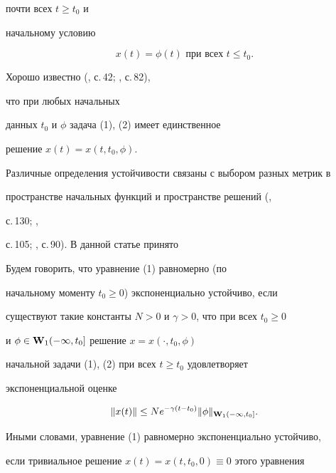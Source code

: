 почти всех $t\ge t_0$ и


начальному условию




\begin{equation}


x(t)=\phi(t)\text{ при всех }t\le t_0.


\end{equation}


%


Хорошо известно (\cite{Kol}, с.\,42; \cite{Ku3}, с.\,82),


что при любых начальных


данных $t_0$ и $\phi$ задача (1), (2) имеет единственное


решение $x(t)=x(t,t_0,\phi)$.





Различные определения устойчивости связаны с выбором разных метрик в


пространстве начальных функций и пространстве решений (\cite{Hale},


с.\,130; \cite{Kol},


с.\,105; \cite{Ku3}, с.\,90). В данной статье принято





\begin{defn} Будем говорить, что уравнение (1) равномерно (по


начальному моменту $t_0\ge0$) экспоненциально устойчиво, если


существуют такие константы $N>0$ и $\gamma>0$, что при всех $t_0\ge0$


и $\phi\in\bold W_1(-\infty,t_0]$ решение $x=x(\cdot,t_0,\phi)$


начальной задачи (1), (2) при всех $t\ge t_0$ удовлетворяет


экспоненциальной оценке


%


$$


\|x(t)\|\le Ne^{-\gamma(t-t_0)}\|\phi\|_{\bold W_1(-\infty,t_0]}.


$$


\end{defn}





Иными словами, уравнение (1) равномерно экспоненциально устойчиво,


если тривиальное решение $x(t)=x(t,t_0,0)\equiv 0$ этого уравнения


